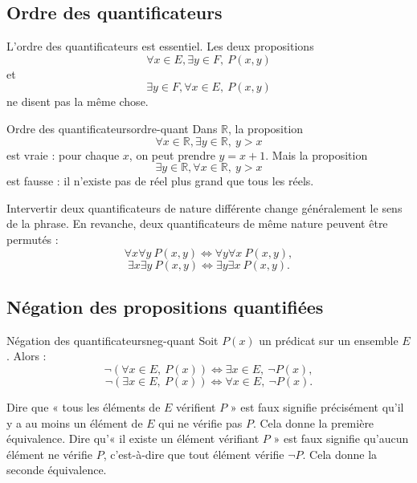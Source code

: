 \documentclass[11pt,a4paper]{article}
\newcommand{\R}{\mathbb{R}}
\begin{document}
\subsection{Ordre des quantificateurs}

L'ordre des quantificateurs est essentiel. Les deux propositions
\[
\forall x\in E,\exists y\in F,\ P(x,y)
\]
et
\[
\exists y\in F,\forall x\in E,\ P(x,y)
\]
ne disent pas la même chose.

\begin{exemplebox}{Ordre des quantificateurs}{ordre-quant}
Dans $\R$, la proposition
\[
\forall x\in\R,\exists y\in\R,\ y>x
\]
est vraie : pour chaque $x$, on peut prendre $y=x+1$. Mais la proposition
\[
\exists y\in\R,\forall x\in\R,\ y>x
\]
est fausse : il n'existe pas de réel plus grand que tous les réels.
\end{exemplebox}

\begin{erreurbox}
Intervertir deux quantificateurs de nature différente change généralement le sens de la phrase. En revanche, deux quantificateurs de même nature peuvent être permutés :
\[
\forall x\forall y\ P(x,y) \Longleftrightarrow \forall y\forall x\ P(x,y),
\]
\[
\exists x\exists y\ P(x,y) \Longleftrightarrow \exists y\exists x\ P(x,y).
\]
\end{erreurbox}

\subsection{Négation des propositions quantifiées}

\begin{theorembox}{Négation des quantificateurs}{neg-quant}
Soit $P(x)$ un prédicat sur un ensemble $E$. Alors :
\[
\neg\left(\forall x\in E,\ P(x)\right)
\Longleftrightarrow
\exists x\in E,\ \neg P(x),
\]
\[
\neg\left(\exists x\in E,\ P(x)\right)
\Longleftrightarrow
\forall x\in E,\ \neg P(x).
\]
\end{theorembox}

\begin{preuvebox}
Dire que « tous les éléments de $E$ vérifient $P$ » est faux signifie précisément qu'il y a au moins un élément de $E$ qui ne vérifie pas $P$. Cela donne la première équivalence. Dire qu'« il existe un élément vérifiant $P$ » est faux signifie qu'aucun élément ne vérifie $P$, c'est-à-dire que tout élément vérifie $\neg P$. Cela donne la seconde équivalence.
\end{preuvebox}
\end{document}

